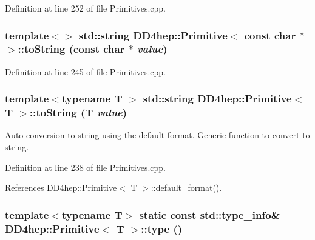 Definition at line 252 of file Primitives.cpp.\hypertarget{struct_d_d4hep_1_1_primitive_a418ae5c5cf4ff6477b59da99fc616895}{
\subsubsection[{toString}]{\setlength{\rightskip}{0pt plus 5cm}template$<$$>$ std::string {\bf DD4hep::Primitive}$<$ const char $\ast$ $>$::toString (const char $\ast$ {\em value})}}
\label{struct_d_d4hep_1_1_primitive_a418ae5c5cf4ff6477b59da99fc616895}


Definition at line 245 of file Primitives.cpp.\hypertarget{struct_d_d4hep_1_1_primitive_a180947d8d7ef75a31553b3c200bbf136}{
\subsubsection[{toString}]{\setlength{\rightskip}{0pt plus 5cm}template$<$typename T $>$ std::string {\bf DD4hep::Primitive}$<$ {\bf T} $>$::toString ({\bf T} {\em value})}}
\label{struct_d_d4hep_1_1_primitive_a180947d8d7ef75a31553b3c200bbf136}


Auto conversion to string using the default format. Generic function to convert to string. 

Definition at line 238 of file Primitives.cpp.

References DD4hep::Primitive$<$ T $>$::default\_\-format().\hypertarget{struct_d_d4hep_1_1_primitive_afd4ccf13e6eaa9bdecdf053a0b0dee50}{
\subsubsection[{type}]{\setlength{\rightskip}{0pt plus 5cm}template$<$typename T$>$ static const std::type\_\-info\& {\bf DD4hep::Primitive}$<$ {\bf T} $>$::type ()}}
\label{struct_d_d4hep_1_1_primitive_afd4ccf13e6eaa9bdecdf053a0b0dee50}


